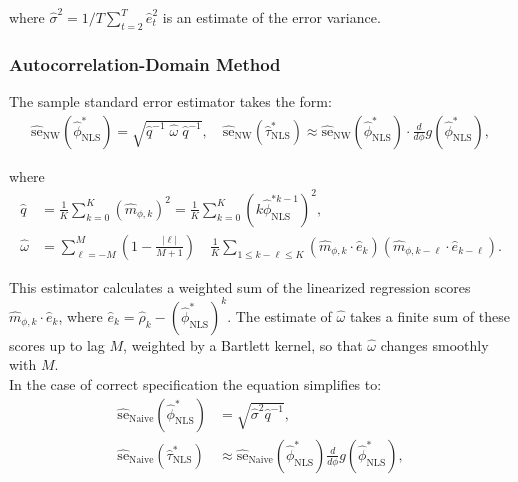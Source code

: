 \documentclass[docs/main.tex]{subfiles}
\begin{document}
\noindent where $\hat\sigma^2 = 1/T \sum_{t=2}^T \hat e_t^2$ is an estimate of the error variance.

\subsubsection{Autocorrelation-Domain Method}\label{sec:stderr-autocorrelation-domain_}
The sample standard error estimator takes the form:
\begin{align}\label{eq:stderr-autocorrelation-domain_}
\widehat{\text{se}}_{\text{NW}}(\hat\phi^*_{\scriptscriptstyle\text{NLS}}) = \sqrt{\hat q^{-1}\;\hat\omega\; \hat q^{-1}}, \quad
\widehat{\text{se}}_{\text{NW}}(\hat\tau^*_{\scriptscriptstyle\text{NLS}}) \approx \widehat{\text{se}}_{\text{NW}}(\hat\phi^*_{\scriptscriptstyle\text{NLS}}) \cdot \frac{d}{d\phi} g(\hat\phi^*_{\scriptscriptstyle\text{NLS}}),
\end{align}

\noindent where
\begin{align}
    \hat q &= \frac{1}{K} \sum_{k=0}^K (\hat m_{\phi,k})^2 = \frac{1}{K} \sum_{k=0}^K (k \hat\phi_{\scriptscriptstyle\text{NLS}}^{*k-1})^2,\\
    \hat \omega &= \sum_{\ell=-M}^M \left(1 - \frac{|\ell|}{M+1}\right) \quad \frac{1}{K} \sum_{1 \le k - \ell \le K} (\hat m_{\phi, k} \cdot \hat e_k) (\hat m_{\phi, k-\ell} \cdot \hat e_{k-\ell}).\label{eq:nls_q_omega_}
\end{align}

\noindent This estimator calculates a weighted sum of the linearized regression scores $\hat m_{\phi, k} \cdot \hat e_k$, where $\hat e_k = \hat\rho_k - (\hat\phi^*_{\scriptscriptstyle\text{NLS}})^k$. The estimate of $\hat\omega$ takes a finite sum of these scores up to lag $M$, weighted by a Bartlett kernel, so that $\hat\omega$ changes smoothly with $M$.\\

\noindent In the case of correct specification the equation simplifies to:
\begin{align}
    \widehat{\text{se}}_\text{Naive}(\hat\phi^*_{\scriptscriptstyle\text{NLS}}) &= \sqrt{\hat\sigma^2 \hat q^{-1}},\\
    \widehat{\text{se}}_\text{Naive}(\hat\tau^*_{\scriptscriptstyle\text{NLS}}) &\approx \widehat{\text{se}}_{\text{Naive}}(\hat\phi^*_{\scriptscriptstyle\text{NLS}}) \frac{d}{d\phi} g(\hat\phi^*_{\scriptscriptstyle\text{NLS}}),
\end{align}
\end{document}
